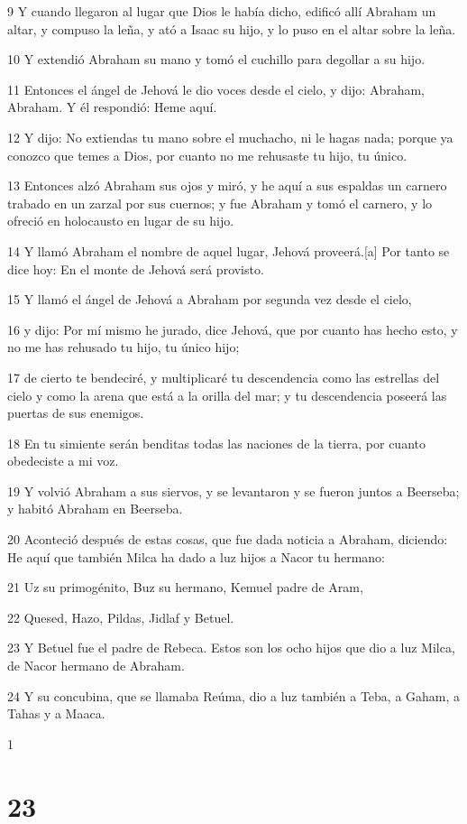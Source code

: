 9 Y cuando llegaron al lugar que Dios le había dicho, edificó allí Abraham un altar, y compuso la leña, y ató a Isaac su hijo, y lo puso en el altar sobre la leña.

10 Y extendió Abraham su mano y tomó el cuchillo para degollar a su hijo.

11 Entonces el ángel de Jehová le dio voces desde el cielo, y dijo: Abraham, Abraham. Y él respondió: Heme aquí.

12 Y dijo: No extiendas tu mano sobre el muchacho, ni le hagas nada; porque ya conozco que temes a Dios, por cuanto no me rehusaste tu hijo, tu único.

13 Entonces alzó Abraham sus ojos y miró, y he aquí a sus espaldas un carnero trabado en un zarzal por sus cuernos; y fue Abraham y tomó el carnero, y lo ofreció en holocausto en lugar de su hijo.

14 Y llamó Abraham el nombre de aquel lugar, Jehová proveerá.[a] Por tanto se dice hoy: En el monte de Jehová será provisto.

15 Y llamó el ángel de Jehová a Abraham por segunda vez desde el cielo,

16 y dijo: Por mí mismo he jurado, dice Jehová, que por cuanto has hecho esto, y no me has rehusado tu hijo, tu único hijo;

17 de cierto te bendeciré, y multiplicaré tu descendencia como las estrellas del cielo y como la arena que está a la orilla del mar; y tu descendencia poseerá las puertas de sus enemigos.

18 En tu simiente serán benditas todas las naciones de la tierra, por cuanto obedeciste a mi voz.

19 Y volvió Abraham a sus siervos, y se levantaron y se fueron juntos a Beerseba; y habitó Abraham en Beerseba.

20 Aconteció después de estas cosas, que fue dada noticia a Abraham, diciendo: He aquí que también Milca ha dado a luz hijos a Nacor tu hermano:

21 Uz su primogénito, Buz su hermano, Kemuel padre de Aram,

22 Quesed, Hazo, Pildas, Jidlaf y Betuel.

23 Y Betuel fue el padre de Rebeca. Estos son los ocho hijos que dio a luz Milca, de Nacor hermano de Abraham.

24 Y su concubina, que se llamaba Reúma, dio a luz también a Teba, a Gaham, a Tahas y a Maaca.

1 

\chapter{23}

